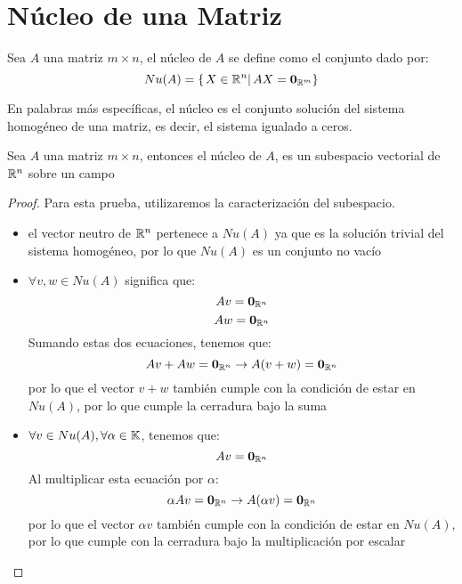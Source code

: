 \section{Núcleo de una Matriz}
\begin{dfn}
Sea $A$ una matriz $m\times n$, el núcleo de $A$ se define como el conjunto dado por:
~\\
\[Nu(A)=\left\{ \left. X \in \mathbb{R}^n \right| AX=\mathbf{0}_{\mathbb{R}^m} \right\}\]
\end{dfn}
En palabras más específicas, el núcleo es el conjunto solución del sistema homogéneo de una matriz, es decir, el sistema igualado a ceros.
~\\
\begin{theorem}
Sea $A$ una matriz $m \times n$, entonces el núcleo de $A$, es un subespacio vectorial de $\mathbb{R}^n$ sobre un campo \dobleK
\end{theorem}
\begin{proof}
    Para esta prueba, utilizaremos la caracterización del subespacio.
    \begin{itemize}
        \item el vector neutro de $\mathbb{R}^n$ pertenece a $Nu(A)$ ya que es la solución trivial del sistema homogéneo, por lo que $Nu(A)$ es un conjunto no vacío
        \item $\forall v,w \in Nu(A)$ significa que:
        $$Av = \mathbf{0}_{\mathbb{R}^n}$$
        $$Aw = \mathbf{0}_{\mathbb{R}^n}$$
        Sumando estas dos ecuaciones, tenemos que:
        $$Av + Aw = \mathbf{0}_{\mathbb{R}^n} \rightarrow A(v+w) = \mathbf{0}_{\mathbb{R}^n}$$
        por lo que el vector $v+w$ también cumple con la condición de estar en $Nu(A)$, por lo que cumple la cerradura bajo la suma
        \item $\forall v \in Nu(A), \forall \alpha \in \mathbb{K}$, tenemos que:
        $$Av = \mathbf{0}_{\mathbb{R}^n}$$
        Al multiplicar esta ecuación por $\alpha$:
        $$\alpha Av = \mathbf{0}_{\mathbb{R}^n} \rightarrow A(\alpha v) = \mathbf{0}_{\mathbb{R}^n}$$
        por lo que el vector $\alpha v$ también cumple con la condición de estar en $Nu(A)$, por lo que cumple con la cerradura bajo la multiplicación por escalar
    \end{itemize}
\end{proof}

